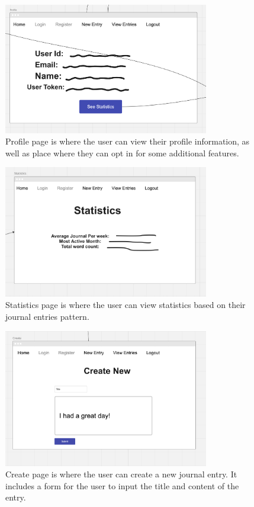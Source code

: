 \begin{figure}[H]
    \centering
    \includegraphics[width=0.8\textwidth]{Assets/profile_page.png}
    \caption{Profile page is where the user can view their profile information, as well as place where they can opt in for some additional features.}
\end{figure}


\begin{figure}[H]
    \centering
    \includegraphics[width=0.8\textwidth]{Assets/statistics_page.png}
    \caption{Statistics page is where the user can view statistics based on their journal entries pattern.}
\end{figure}


\begin{figure}[H]
    \centering
    \includegraphics[width=0.8\textwidth]{Assets/create_page.png}
    \caption{Create page is where the user can create a new journal entry. It includes a form for the user to input the title and content of the entry.}
\end{figure}

